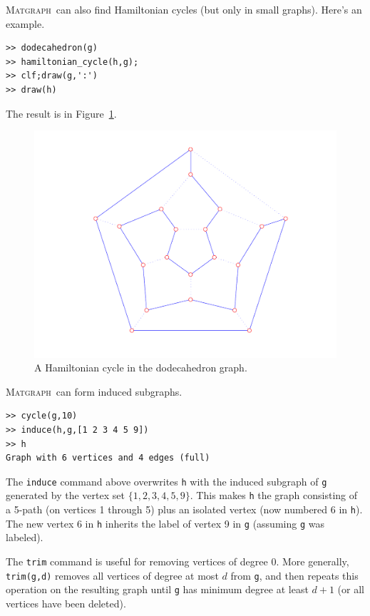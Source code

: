 \documentclass[12pt]{amsart}
\newcommand\matgraph{\textsc{Matgraph}}
\begin{document}
\matgraph\ can also find Hamiltonian cycles (but only in small
graphs). Here's an example.
\begin{verbatim}
>> dodecahedron(g)
>> hamiltonian_cycle(h,g);
>> clf;draw(g,':')
>> draw(h)
\end{verbatim}
The result is in Figure~\ref{fig:ham-cycle}.
\begin{figure}[ht]
  \begin{center}
    \includegraphics[scale=0.5]{figs/ham-cycle}
  \end{center}
  \caption{A Hamiltonian cycle in the dodecahedron graph.}
  \label{fig:ham-cycle}
\end{figure}

\matgraph\ can form induced subgraphs.
\begin{verbatim}
>> cycle(g,10)
>> induce(h,g,[1 2 3 4 5 9])
>> h
Graph with 6 vertices and 4 edges (full)
\end{verbatim}
The \verb|induce| command above overwrites \verb|h| with the induced
subgraph of \verb|g| generated by the vertex set
$\{1,2,3,4,5,9\}$. This makes \verb|h| the graph consisting of a
5-path (on vertices 1 through 5) plus an isolated vertex (now numbered
6 in \verb|h|). The new vertex 6 in \verb|h| inherits the label of
vertex 9 in \verb|g| (assuming \verb|g| was labeled).

The \verb|trim| command is useful for removing vertices of degree
0. More generally, \verb|trim(g,d)| removes all vertices of degree at
most $d$ from \verb|g|, and then repeats this operation on the
resulting graph until \verb|g| has minimum degree at least $d+1$ (or
all vertices have been deleted).
\end{document}
